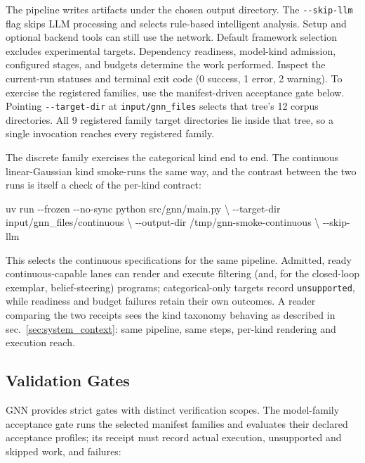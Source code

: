 \documentclass[
  english,
  9pt,
]{extarticle}
\newenvironment{Shaded}{}{}
\newcommand{\AttributeTok}[1]{\textcolor[rgb]{0.49,0.56,0.16}{#1}}
\newcommand{\DataTypeTok}[1]{\textcolor[rgb]{0.56,0.13,0.00}{#1}}
\newcommand{\ExtensionTok}[1]{#1}
\newcommand{\NormalTok}[1]{#1}
\begin{document}
The pipeline writes artifacts under the chosen output directory. The
\texttt{-\/-skip-llm} flag skips LLM processing and selects rule-based
intelligent analysis. Setup and optional backend tools can still use the
network. Default framework selection excludes experimental targets.
Dependency readiness, model-kind admission, configured stages, and
budgets determine the work performed. Inspect the current-run statuses
and terminal exit code (0 success, 1 error, 2 warning). To exercise the
registered families, use the manifest-driven acceptance gate below.
Pointing \texttt{-\/-target-dir} at \texttt{input/gnn\_files} selects
that tree's 12 corpus directories. All 9 registered family target
directories lie inside that tree, so a single invocation reaches every
registered family.

The discrete family exercises the categorical kind end to end. The
continuous linear-Gaussian kind smoke-runs the same way, and the
contrast between the two runs is itself a check of the per-kind
contract:

\begin{Shaded}
\begin{Highlighting}[]
\ExtensionTok{uv}\NormalTok{ run }\AttributeTok{{-}{-}frozen} \AttributeTok{{-}{-}no{-}sync}\NormalTok{ python src/gnn/main.py }\DataTypeTok{\textbackslash{}}
  \AttributeTok{{-}{-}target{-}dir}\NormalTok{ input/gnn\_files/continuous }\DataTypeTok{\textbackslash{}}
  \AttributeTok{{-}{-}output{-}dir}\NormalTok{ /tmp/gnn{-}smoke{-}continuous }\DataTypeTok{\textbackslash{}}
  \AttributeTok{{-}{-}skip{-}llm}
\end{Highlighting}
\end{Shaded}

This selects the continuous specifications for the same pipeline.
Admitted, ready continuous-capable lanes can render and execute
filtering (and, for the closed-loop exemplar, belief-steering) programs;
categorical-only targets record \texttt{unsupported}, while readiness
and budget failures retain their own outcomes. A reader comparing the
two receipts sees the kind taxonomy behaving as described in
sec.~\ref{sec:system_context}: same pipeline, same steps, per-kind
rendering and execution reach.

\subsection{Validation Gates}\label{validation-gates}

GNN provides strict gates with distinct verification scopes. The
model-family acceptance gate runs the selected manifest families and
evaluates their declared acceptance profiles; its receipt must record
actual execution, unsupported and skipped work, and failures:
\end{document}
